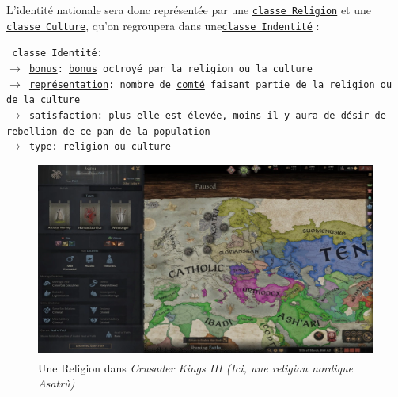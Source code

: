 \documentclass{article}
\newcommand{\ulcolor}[2][class]{\setulcolor{#1}\ul{#2}}
\newcommand{\ulcolor}[2][var]{\setulcolor{#1}\ul{#2}}
\newcommand{\ulcolor}[2][func]{\setulcolor{#1}\ul{#2}}
\newcommand*{\mybox}[2]{\colorbox{#1!30}{\parbox{.98\linewidth}{#2}}}
\newcommand\tab[1][0.5cm]{\hspace*{#1}}
\newcommand{\genbox}[1]{\mybox{verylightgray}{#1}}
\newcommand{\classbox}[1]{\mybox{palegreen}{\texttt{\textcolor{codeColour}{#1}}}}
\newcommand{\class}[1]{\texttt{\textcolor{codeColour}{\ulcolor[class]{#1}}}}
\newcommand{\var}[1]{\texttt{\textcolor{codeColour}{\ulcolor[var]{#1}}}}
\def\reg{\small{\textsuperscript{\textregistered}}}
\begin{document}
                \tab \genbox{
                    L'identité nationale sera donc représentée par une \class{classe Religion} et une \class{classe Culture}, qu'on regroupera dans une\class{classe Indentit\'e} : \\
                    \tab \classbox{
                        classe Identité: \\
                            $\rightarrow$ \var{bonus}: \class{bonus} octroyé par la religion ou la culture\\
                            $\rightarrow$ \var{repr\'esentation}: nombre de \class{comt\'e} faisant partie de la religion ou de la culture \\
                            $\rightarrow$ \var{satisfaction}: plus elle est élevée, moins il y aura de désir de rebellion de ce pan de la population\\
                            $\rightarrow$ \var{type}: religion ou culture \\ 
                    } 
                }

                \begin{figure}[h]
                    \centering
                        \includegraphics[scale=0.3]{image_ck3_religion.png}
                        \caption{Une Religion dans \textit{Crusader Kings III\reg} \textit{(Ici, une religion nordique Asatrù)}}
                        \label{fig:x photosysteme}
                \end{figure}
            
\end{document}
